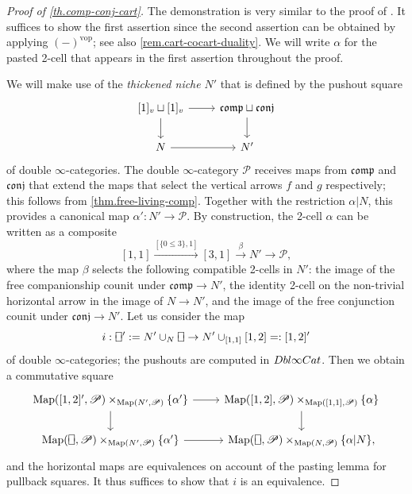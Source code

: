 \documentclass[a4paper, 11pt]{amsart}
\numberwithin{theorem}{section}
\theoremstyle{definition}
\newcommand{\cat}[1]{\textup{#1}}
\newcommand{\map}{\mathrm{Map}}
\renewcommand{\P}{\mathscr{P}}
\newcommand{\DbliCat}{\cat{Dbl}\infty\cat{Cat}}
\newcommand{\conj}{\mathfrak{conj}}
\newcommand{\comp}{\mathfrak{comp}}
\newcommand*{\vrectangle}{{\ooalign{\lower.3ex\hbox{$\sqcup$}\cr\raise.4ex\hbox{$\sqcap$}}}}
\begin{document}
\begin{proof}[Proof of \cref{th.comp-conj-cart}]
	The demonstration is very similar to the proof of \cite[Theorem 4.22]{Comp}. 
	It suffices to show the first assertion since the second assertion can be obtained by applying 
	$(-)^{\mathrm{vop}}$; see also \cref{rem.cart-cocart-duality}. We will write $\alpha$ for the pasted
	2-cell that appears in the first assertion throughout the proof. 
	
	We will make use of the \textit{thickened niche} $N'$ that is defined by the pushout square
	\[
		\begin{tikzcd}
			{[1]_v} \sqcup {[1]_v} \arrow[d]\arrow[r] & \comp \sqcup \conj \arrow[d] \\
			N \arrow[r] & N'
		\end{tikzcd}
	\]
	of double $\infty$-categories. The double $\infty$-category $\P$ receives maps from $\comp$ and $\conj$ 
	that extend the maps that select the vertical arrows $f$ and $g$ respectively; this follows from \cref{thm.free-living-comp}. Together with the restriction $\alpha|N$, 
	this provides a canonical map 
	$
	\alpha' : N' \rightarrow \P.
	$
	By construction, the 2-cell $\alpha$ can be written as a composite 
	\[
		[1,1] \xrightarrow{[\{0\leq 3\},1]} [3,1] \xrightarrow{\beta} N' \rightarrow \P,
	\]
	where the map $\beta$ selects the following compatible 2-cells in $N'$: the image of the free companionship counit 
	under $\comp \rightarrow N'$, the identity 2-cell on the non-trivial horizontal arrow in the image of $N \rightarrow N'$, and 
	the image of the free conjunction counit under $\conj \rightarrow N'$.  
	Let us consider the map 
	$$
	i : \vrectangle' := N' \cup_{N} \vrectangle \rightarrow N' \cup_{[1,1]} [1,2] =: [1,2]'
	$$
	of double $\infty$-categories; the pushouts are computed in $\DbliCat$. 
	Then we obtain a commutative square 
	\[
	\begin{tikzcd}
		\map([1,2]', \P) \times_{\map(N',\P)} \{\alpha'\} \arrow[d]\arrow[r] & \map([1,2], \P) \times_{\map([1,1], \P)} \{\alpha\} \arrow[d] \\ 
		\map(\vrectangle, \P) \times_{\map(N',\P)} \{\alpha'\} \arrow[r] & \map(\vrectangle,\P)\times_{\map(N,\P)} \{\alpha|N\},
	\end{tikzcd}
	\]
	and the horizontal maps are equivalences on account of the pasting lemma for pullback squares.
	It thus suffices to show that $i$
	is an equivalence.


\end{proof}
\end{document}
